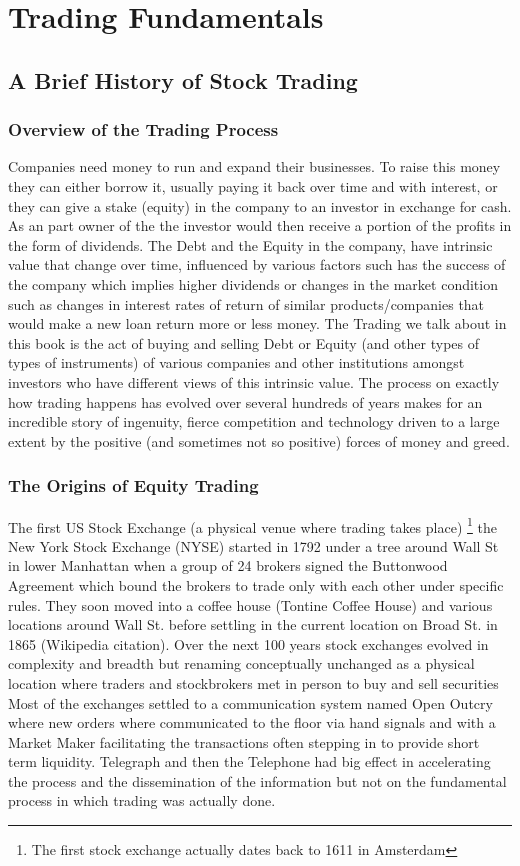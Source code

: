 
\chapter{Trading Fundamentals}

\section{A Brief History of Stock Trading}
\subsection{Overview of the Trading Process}
Companies need money to run and expand their businesses. To raise this money they can either borrow it, usually paying it back over time and with interest, or they can give a stake (equity) in the company to an investor in exchange for cash. As an part owner of the  the investor would then receive a portion of the profits in the form of dividends. The Debt and the Equity in the company,  have intrinsic value that change over time, influenced by various factors such has the success of the company which implies higher dividends or changes in the market condition such as changes in interest rates of return of similar products/companies that would make a new loan return more or less money. The Trading we talk about in this book is the act of buying and selling  Debt or Equity (and other types of types of instruments) of various companies and other institutions amongst investors who have different views of this intrinsic value. The process on exactly how trading happens has evolved over several hundreds of years makes for an incredible story of ingenuity, fierce competition and technology driven to a large extent by the positive (and sometimes not so positive) forces of money and greed.

\subsection{The Origins of Equity Trading}
The first US Stock Exchange (a physical venue where trading takes place) \footnote{The first stock exchange actually dates back to 1611 in Amsterdam} the New York Stock Exchange (NYSE) started in 1792 under a tree around Wall St in lower Manhattan when a group of 24 brokers signed the Buttonwood Agreement which bound the brokers to trade only with each other under specific rules. They soon moved into a coffee house (Tontine Coffee House) and various locations around Wall St. before settling in the current location on Broad St. in 1865 (Wikipedia citation). Over the next 100 years stock exchanges evolved in complexity and breadth but renaming conceptually unchanged as a physical location where traders and stockbrokers met in person to buy and sell securities Most of the exchanges settled to a communication system named Open Outcry where new orders where communicated to the floor via hand signals and with a Market Maker facilitating the transactions often stepping in to provide short term liquidity. Telegraph and then the Telephone had big effect in accelerating the process and the dissemination of the information but not on the fundamental process in which trading was actually done. 

